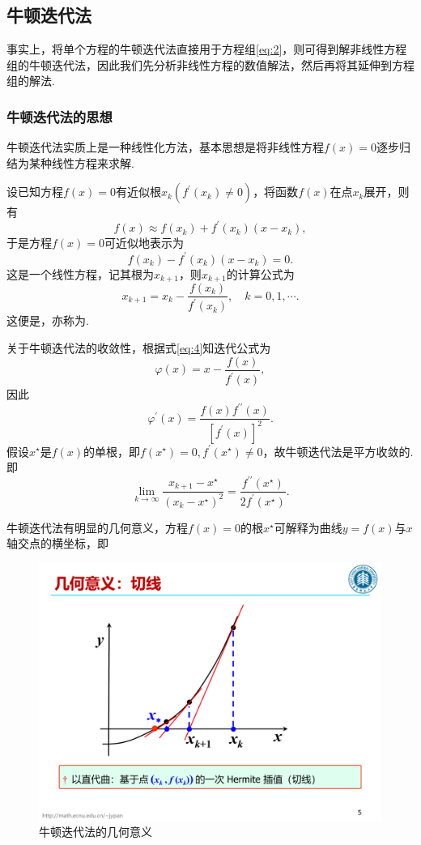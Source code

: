 \documentclass[cn,12pt,founder,a4paper]{elegantpaper}
\newcommand{\douprime}{{\prime\prime}}
\renewcommand{\emph}[1]{{\heiti{#1}}}
\begin{document}
\subsection{牛顿迭代法}
事实上，将单个方程的牛顿迭代法直接用于方程组\eqref{eq:2}，则可得到解非线性方程组的牛顿迭代法，因此我们先分析非线性方程的数值解法，然后再将其延伸到方程组的解法.

\subsubsection{牛顿迭代法的思想}
牛顿迭代法实质上是一种线性化方法，基本思想是将非线性方程\(f(x)=0\)逐步归结为某种线性方程来求解.\par
设已知方程\(f(x)=0\)有近似根\(x_k(f^\prime(x_k)\ne 0)\)，将函数\(f(x)\)在点\(x_k\)展开，则有
\[f(x)\approx f(x_k)+f^\prime(x_k)(x-x_k),\]
于是方程\(f(x)=0\)可近似地表示为
\[f(x_k)-f^\prime(x_k)(x-x_k)=0.\]
这是一个线性方程，记其根为\(x_{k+1}\)，则\(x_{k+1}\)的计算公式为
\begin{equation}\label{eq:4}
  x_{k+1}=x_k-\frac{f(x_k)}{f^\prime(x_k)},\quad k=0,1,\cdots.
\end{equation}
这便是\emph{牛顿迭代法}，亦称为\emph{切线法}.\par
关于牛顿迭代法的收敛性，根据式\eqref{eq:4}知迭代公式为
\[\varphi(x)=x-\frac{f(x)}{f^\prime(x)},\]
因此
\[\varphi^\prime(x)=\frac{f(x)f^\douprime(x)}{[f^\prime(x)]^2}.\]
假设\(x^\star\)是\(f(x)\)的单根，即\(f(x^\star)=0,f^\prime(x^\star)\ne 0\)，故牛顿迭代法是平方收敛的. 即
\[\lim_{k\to\infty}\frac{x_{k+1}-x^\star}{(x_k-x^\star)^2}=\frac{f^\douprime(x^\star)}{2f^\prime(x^\star)}.\]\par
牛顿迭代法有明显的几何意义，方程\(f(x)=0\)的根\(x^\star\)可解释为曲线\(y=f(x)\)与\(x\)轴交点的横坐标，即
\begin{figure}[h]
  \centering
  \includegraphics[scale=0.55]{image/Newton.pdf}
  \caption{牛顿迭代法的几何意义}
\end{figure}
\end{document}
